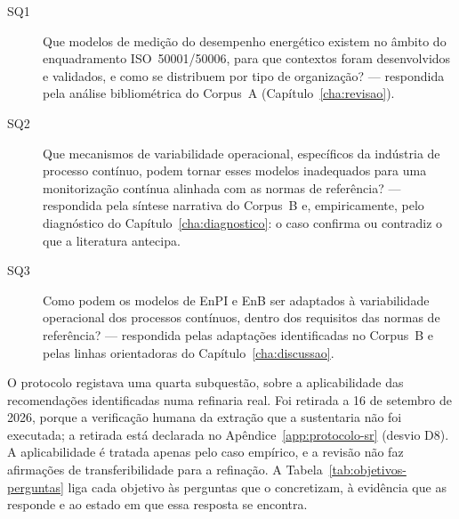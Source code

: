 \begin{description}
  \item[SQ1] Que modelos de medição do desempenho energético existem no
    âmbito do enquadramento ISO~50001/50006, para que contextos foram
    desenvolvidos e validados, e como se distribuem por tipo de
    organização? --- respondida pela análise bibliométrica do Corpus~A
    (Capítulo~\ref{cha:revisao}).
  \item[SQ2] Que mecanismos de variabilidade operacional, específicos da
    indústria de processo contínuo, podem tornar esses modelos
    inadequados para uma monitorização contínua alinhada com as normas
    de referência? --- respondida pela síntese narrativa do Corpus~B e,
    empiricamente, pelo diagnóstico do Capítulo~\ref{cha:diagnostico}: o
    caso confirma ou contradiz o que a literatura antecipa.
  \item[SQ3] Como podem os modelos de EnPI e EnB ser adaptados à
    variabilidade operacional dos processos contínuos, dentro dos
    requisitos das normas de referência? --- respondida pelas
    adaptações identificadas no Corpus~B e pelas linhas orientadoras do
    Capítulo~\ref{cha:discussao}.
\end{description}

O protocolo registava uma quarta subquestão, sobre a aplicabilidade das
recomendações identificadas numa refinaria real. Foi retirada a 16 de
setembro de 2026, porque a verificação humana da extração que a
sustentaria não foi executada; a retirada está declarada no
Apêndice~\ref{app:protocolo-sr} (desvio D8). A aplicabilidade é tratada
apenas pelo caso empírico, e a revisão não faz afirmações de
transferibilidade para a refinação. A Tabela~\ref{tab:objetivos-perguntas}
liga cada objetivo às perguntas que o concretizam, à evidência que as
responde e ao estado em que essa resposta se encontra.

